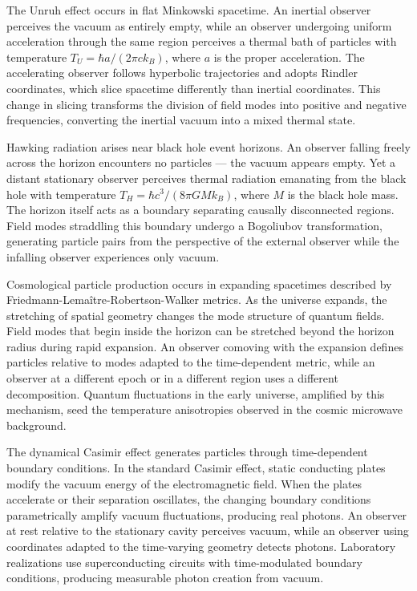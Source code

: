 The Unruh effect occurs in flat Minkowski spacetime. An inertial observer perceives the vacuum as entirely empty, while an observer undergoing uniform acceleration through the same region perceives a thermal bath of particles with temperature $T_U = \hbar a/(2\pi c k_B)$, where $a$ is the proper acceleration. The accelerating observer follows hyperbolic trajectories and adopts Rindler coordinates, which slice spacetime differently than inertial coordinates. This change in slicing transforms the division of field modes into positive and negative frequencies, converting the inertial vacuum into a mixed thermal state.

Hawking radiation arises near black hole event horizons. An observer falling freely across the horizon encounters no particles — the vacuum appears empty. Yet a distant stationary observer perceives thermal radiation emanating from the black hole with temperature $T_H = \hbar c^3/(8\pi G M k_B)$, where $M$ is the black hole mass. The horizon itself acts as a boundary separating causally disconnected regions. Field modes straddling this boundary undergo a Bogoliubov transformation, generating particle pairs from the perspective of the external observer while the infalling observer experiences only vacuum.

Cosmological particle production occurs in expanding spacetimes described by Friedmann-Lemaître-Robertson-Walker metrics. As the universe expands, the stretching of spatial geometry changes the mode structure of quantum fields. Field modes that begin inside the horizon can be stretched beyond the horizon radius during rapid expansion. An observer comoving with the expansion defines particles relative to modes adapted to the time-dependent metric, while an observer at a different epoch or in a different region uses a different decomposition. Quantum fluctuations in the early universe, amplified by this mechanism, seed the temperature anisotropies observed in the cosmic microwave background.

The dynamical Casimir effect generates particles through time-dependent boundary conditions. In the standard Casimir effect, static conducting plates modify the vacuum energy of the electromagnetic field. When the plates accelerate or their separation oscillates, the changing boundary conditions parametrically amplify vacuum fluctuations, producing real photons. An observer at rest relative to the stationary cavity perceives vacuum, while an observer using coordinates adapted to the time-varying geometry detects photons. Laboratory realizations use superconducting circuits with time-modulated boundary conditions, producing measurable photon creation from vacuum.


